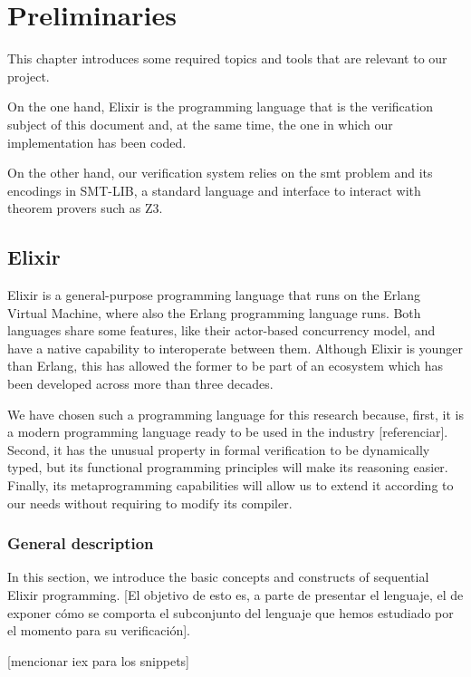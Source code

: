 \chapter{Preliminaries}
\label{cap:preliminaries}

This chapter introduces some required topics and tools that are relevant to
our project. 

On the one hand, Elixir is the programming language that is the verification 
subject of this document and, at the same time, the one in which our 
implementation has been coded. 

On the other hand, our verification system relies on the \gls{smt} problem and
its encodings in SMT-LIB, a standard language and interface to interact with 
theorem provers such as Z3.

\section{Elixir}

Elixir is a general-purpose programming language that runs on the Erlang
Virtual Machine, where also the Erlang programming language runs. Both
languages share some features, like their actor-based concurrency model, and
have a native capability to interoperate between them. Although Elixir is
younger than Erlang, this has allowed the former to be part of an ecosystem
which has been developed across more than three decades.

We have chosen such a programming language for this research because,
first, it is a modern programming language ready to be used in the
industry [referenciar]. Second, it has the unusual property in formal 
verification to be dynamically typed, but its functional programming principles
will make its reasoning easier. Finally, its metaprogramming capabilities will
allow us to extend it according to our needs without requiring to modify its 
compiler.

\subsection{General description}

In this section, we introduce the basic concepts and constructs of sequential
Elixir programming. [El objetivo de esto es, a parte de presentar el lenguaje,
el de exponer cómo se comporta el subconjunto del lenguaje que hemos estudiado
por el momento para su verificación].

[mencionar iex para los snippets]

